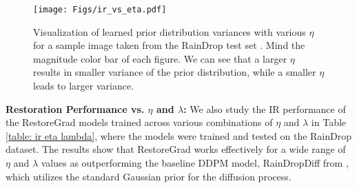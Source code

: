 \begin{figure}[!th]
    \centering
    \texttt{[image: Figs/ir\_vs\_eta.pdf]}
    \vspace{-0.4cm}
    \caption{Visualization of learned prior distribution variances with various $\eta$ for a sample image taken from the RainDrop test set \citep{qian2018attentive}. Mind the magnitude color bar of each figure. We can see that a larger $\eta$ results in smaller variance of the prior distribution, while a smaller $\eta$ leads to larger variance.} 
\label{fig: learned prior vs eta image}
\end{figure}

\vspace{0.2cm}

\noindent\textbf{Restoration Performance vs. $\eta$ and $\lambda$:}
We also study the IR performance of the RestoreGrad models trained across various combinations of $\eta$ and $\lambda$ in Table \ref{table: ir eta lambda}, where the models were trained and tested on the RainDrop dataset. The results show that RestoreGrad works effectively for a wide range of $\eta$ and $\lambda$ values as outperforming the baseline DDPM model, RainDropDiff from \citet{ozdenizci2023restoring}, which utilizes the standard Gaussian prior for the diffusion process.


